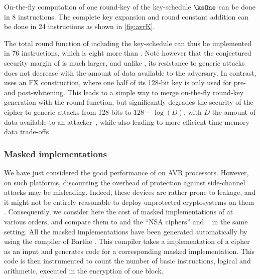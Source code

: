 On-the-fly computation of one round-key of the key-schedule $\ksOne$ can be done in 8 instructions. The complete key expansion and round constant addition can be done in 24 instructions
as shown in \autoref{fig:avrK}.

The total round function of \fly including the key-schedule can thus be implemented in 76 instructions, which is eight more than \pride. Note however that the conjectured security
margin of \fly is much larger, and unlike \pride, its resistance to generic attacks does not decrease with the amount of data available to the adversary. In contrast,
\pride uses an FX construction,
where one half of its 128-bit key is only used for pre- and post-whitening. This
leads to a simple way to merge on-the-fly round-key generation with the round function, but significantly degrades the security of the cipher to generic attacks
from 128 bits to $128 - \log(D)$, with $D$ the amount of data available to an attacker~\cite{desx}, while also leading to more efficient time-memory-data trade-offs \cite{itaitmd}.

\subsubsection{Masked implementations}
We have just considered the good performance of \fly on AVR processors.
However, on such platforms, discounting the overhead of protection
against side-channel attacks may be misleading.
Indeed, these devices are rather prone to leakage, and it might not be
entirely reasonable to deploy unprotected cryptosystems on them \cite{avrleak}.
Consequently, we consider here the cost of masked implementations of \fly at various orders,
and compare them to \pride and the ``NSA ciphers'' \simon and \speck~\cite{NSAciph} in the same setting.
All the masked implementations have been generated automatically by
using the compiler of Barthe \etal{} \cite{maskingcomp}.
This compiler takes a \C implementation of a cipher as an input and generates \C code for a corresponding masked implementation. This code is then instrumented to count the number of basic instructions,
\eg{} logical and arithmetic, executed in the encryption of one block.

